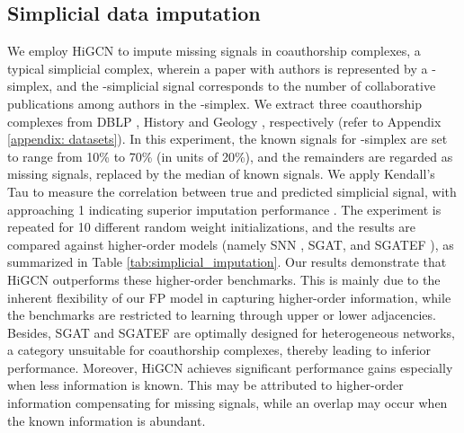 \documentclass[letterpaper]{article} \usepackage{aaai24}
\theoremstyle{plain}
\theoremstyle{definition}
\theoremstyle{remark}
\begin{document}
\subsection{Simplicial data imputation}
We employ HiGCN to impute missing signals in coauthorship complexes, a typical simplicial complex, wherein a paper with  authors is represented by a -simplex, and the -simplicial signal corresponds to the number of collaborative publications among authors in the -simplex. 
We extract three coauthorship complexes from DBLP \cite{data:DBLP-Benson2018}, History and Geology \cite{data:MAG-His-Geo}, respectively (refer to Appendix \ref{appendix: datasets}).  
In this experiment, the known signals for -simplex are set to range from 10\% to 70\% (in units of 20\%), and the remainders are regarded as missing signals, replaced by the median of known signals. We apply Kendall's Tau  to measure the correlation between true and predicted simplicial signal, with  approaching 1 indicating superior imputation performance \cite{kendall1938new}.
The experiment is repeated for 10 different random weight initializations, and the results are compared against higher-order models (namely SNN \cite{SNN2020}, SGAT, and SGATEF \cite{SGAT}), as summarized in Table \ref{tab:simplicial_imputation}.
Our results demonstrate that HiGCN outperforms these higher-order benchmarks.
This is mainly due to the inherent flexibility of our FP model in capturing higher-order information, while the benchmarks are restricted to learning through upper or lower adjacencies.
Besides, SGAT and SGATEF are optimally designed for  heterogeneous networks, a category unsuitable for coauthorship complexes, thereby leading to inferior performance.
Moreover, HiGCN achieves significant performance gains especially when less information is known. This may be attributed to higher-order information compensating for missing signals, while an overlap may occur when the known information is abundant.
\end{document}
